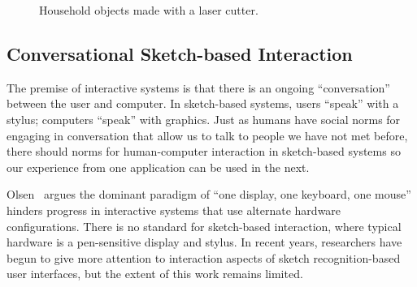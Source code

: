 \documentclass[12pt]{article}
\begin{document}
\begin{figure}
\centering 
{}
\hspace{1cm} 
\caption{Household objects made with a laser cutter.}
\label{fig:flat}
\end{figure}

\subsection{Conversational Sketch-based Interaction}

The premise of interactive systems is that there is an ongoing
``conversation'' between the user and computer. In sketch-based
systems, users ``speak'' with a stylus; computers ``speak'' with
graphics. Just as humans have social norms for engaging in
conversation that allow us to talk to people we have not met before,
there should norms for human-computer interaction in sketch-based
systems so our experience from one application can be used in the
next.

Olsen~\cite{olsen-ui-research} argues the dominant paradigm of ``one
display, one keyboard, one mouse'' hinders progress in interactive
systems that use alternate hardware configurations. There is no
standard for sketch-based interaction, where typical hardware is a
pen-sensitive display and stylus. In recent years, researchers have
begun to give more attention to interaction aspects of sketch
recognition-based user interfaces, but the extent of this work remains
limited.
\end{document}
